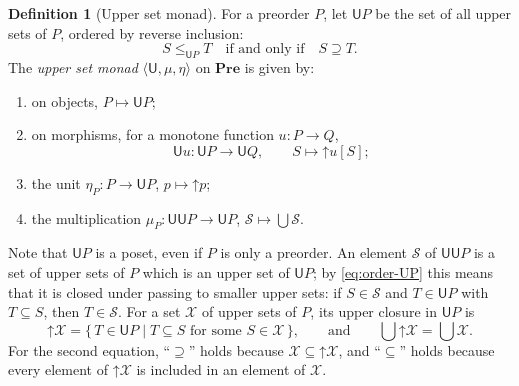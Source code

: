 \documentclass[11pt,a4paper]{article}
\theoremstyle{plain}
\theoremstyle{definition}
\newtheorem{definition}[theorem]{Definition}
\theoremstyle{remark}
\newcommand{\Cat}[1]{\mathbf{#1}}
\newcommand{\Pre}{\Cat{Pre}}
\newcommand{\U}{\mathsf{U}}
\newcommand{\tup}[1]{\langle #1 \rangle}
\newcommand{\up}{\mathord{\uparrow}}
\begin{document}
\begin{definition}[Upper set monad]
    \label{def:U}
    For a preorder $P$, let $\U P$ be the set of all upper sets of $P$, ordered by reverse inclusion:
    \begin{equation}
        \label{eq:order-UP}
        S \leq_{\U P} T \quad \text{if and only if} \quad S \supseteq T.
    \end{equation}
    The \emph{upper set monad} $\tup{\U, \mu, \eta}$ on $\Pre$ is given by:
    \begin{enumerate}
        \item on objects, $P \mapsto \U P$;
        \item on morphisms, for a monotone function $u \colon P \to Q$,
              \begin{equation*}
                  \U u \colon \U P \to \U Q, \qquad S \mapsto \up u[S];
              \end{equation*}
        \item the unit $\eta_P \colon P \to \U P$, $p \mapsto \up p$;
        \item the multiplication $\mu_P \colon \U\U P \to \U P$, $\mathcal{S} \mapsto \bigcup \mathcal{S}$.
    \end{enumerate}
\end{definition}

Note that $\U P$ is a poset, even if $P$ is only a preorder.
An element $\mathcal{S}$ of $\U\U P$ is a set of upper sets of $P$ which is an upper set of $\U P$; by \cref{eq:order-UP} this means that it is closed under passing to smaller upper sets: if $S \in \mathcal{S}$ and $T \in \U P$ with $T \subseteq S$, then $T \in \mathcal{S}$.
For a set $\mathcal{X}$ of upper sets of $P$, its upper closure in $\U P$ is
\begin{equation}
    \label{eq:upper-closure-in-UP}
    \up \mathcal{X} = \{\, T \in \U P \mid T \subseteq S \text{ for some } S \in \mathcal{X} \,\},
    \qquad \text{and} \qquad
    \textstyle\bigcup \up \mathcal{X} = \bigcup \mathcal{X}.
\end{equation}
For the second equation, ``$\supseteq$'' holds because $\mathcal{X} \subseteq \up \mathcal{X}$, and ``$\subseteq$'' holds because every element of $\up\mathcal{X}$ is included in an element of $\mathcal{X}$.
\end{document}
